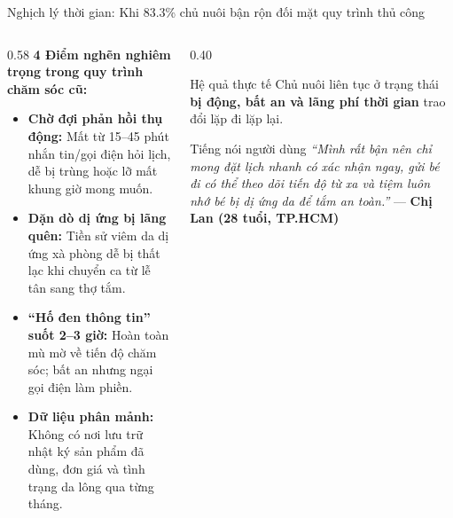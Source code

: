 
\begin{frame}{Nghịch lý thời gian: Khi 83.3\% chủ nuôi bận rộn đối mặt quy trình thủ công}
  \begin{columns}[T]
    \begin{column}{0.58\textwidth}
      \textbf{4 Điểm nghẽn nghiêm trọng trong quy trình chăm sóc cũ:}
      \begin{itemize}
        \item \textbf{Chờ đợi phản hồi thụ động:} Mất từ 15--45 phút nhắn tin/gọi điện hỏi lịch, dễ bị trùng hoặc lỡ mất khung giờ mong muốn.
        \item \textbf{Dặn dò dị ứng bị lãng quên:} Tiền sử viêm da dị ứng xà phòng dễ bị thất lạc khi chuyển ca từ lễ tân sang thợ tắm.
        \item \textbf{``Hố đen thông tin'' suốt 2--3 giờ:} Hoàn toàn mù mờ về tiến độ chăm sóc; bất an nhưng ngại gọi điện làm phiền.
        \item \textbf{Dữ liệu phân mảnh:} Không có nơi lưu trữ nhật ký sản phẩm đã dùng, đơn giá và tình trạng da lông qua từng tháng.
      \end{itemize}
    \end{column}

    \begin{column}{0.40\textwidth}
      \begin{alertblock}{Hệ quả thực tế}
        Chủ nuôi liên tục ở trạng thái \textbf{bị động, bất an và lãng phí thời gian} trao đổi lặp đi lặp lại.
      \end{alertblock}
      \vskip 2mm
      \begin{exampleblock}{Tiếng nói người dùng}
        \footnotesize \textit{``Mình rất bận nên chỉ mong đặt lịch nhanh có xác nhận ngay, gửi bé đi có thể theo dõi tiến độ từ xa và tiệm luôn nhớ bé bị dị ứng da để tắm an toàn.''}
        \vskip 1mm
        \hfill --- \textbf{Chị Lan (28 tuổi, TP.HCM)}
      \end{exampleblock}
    \end{column}
  \end{columns}
\end{frame}

